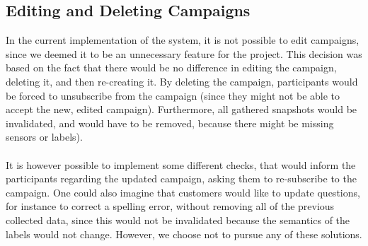 \subsection{Editing and Deleting Campaigns}

In the current implementation of the system, it is not possible to edit campaigns, since we deemed it to be an unnecessary feature for the project. This decision was based on the fact that there would be no difference in editing the campaign, deleting it, and then re-creating it. By deleting the campaign, participants would be forced to unsubscribe from the campaign (since they might not be able to accept the new, edited campaign). Furthermore, all gathered snapshots would be invalidated, and would have to be removed, because there might be missing sensors or labels).
\\\\
It is however possible to implement some different checks, that would inform the participants regarding the updated campaign, asking them to re-subscribe to the campaign. One could also imagine that customers would like to update questions, for instance to correct a spelling error, without removing all of the previous collected data, since this would not be invalidated because the semantics of the labels would not change. However, we choose not to pursue any of these solutions.

